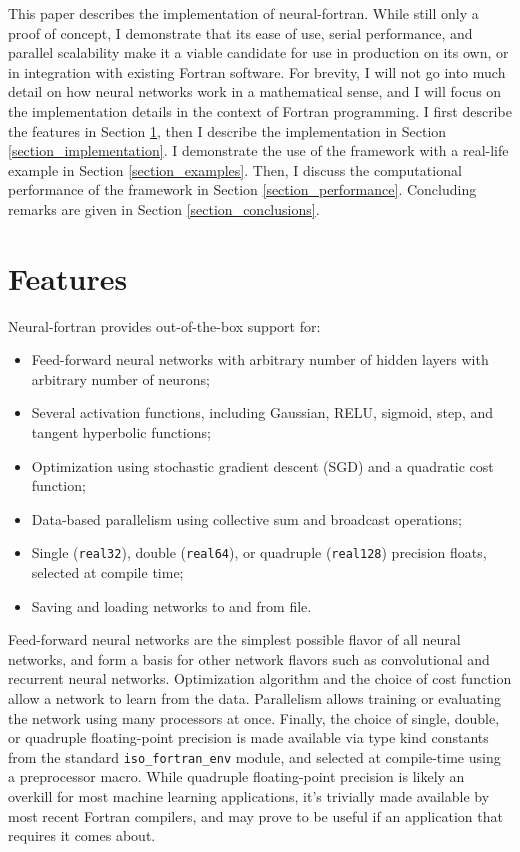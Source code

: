 \documentclass[sigplan, review=false, screen=true, balance=true]{acmart}
\begin{document}
This paper describes the implementation of neural-fortran. While still only a
proof of concept, I demonstrate that its ease of use, serial performance, and
parallel scalability make it a viable candidate for use in production on its
own, or in integration with existing Fortran software. For brevity, I will not
go into much detail on how neural networks work in a mathematical sense, and I
will focus on the implementation details in the context of Fortran programming.
I first describe the features in Section \ref{section_features}, then I describe
the implementation in Section \ref{section_implementation}. I demonstrate the
use of the framework with a real-life example in Section \ref{section_examples}.
Then, I discuss the computational performance of the framework in Section
\ref{section_performance}. Concluding remarks are given in Section
\ref{section_conclusions}.

\section{Features} \label{section_features}

Neural-fortran provides out-of-the-box support for:

\begin{itemize}
  \item Feed-forward neural networks with arbitrary number of hidden layers with
  arbitrary number of neurons;
  \item Several activation functions, including Gaussian, RELU, sigmoid, step,
  and tangent hyperbolic functions;
  \item Optimization using stochastic gradient descent (SGD) \citep{rumelhart86}
  and a quadratic cost function;
  \item Data-based parallelism using collective sum and broadcast operations;
  \item Single (\lstinline{real32}), double (\lstinline{real64}), or quadruple
  (\lstinline{real128}) precision floats, selected at compile time;
  \item Saving and loading networks to and from file.
\end{itemize}

Feed-forward neural networks are the simplest possible flavor of all neural
networks, and form a basis for other network flavors such as convolutional
\citep{krizhevsky12} and recurrent \citep{hochreiter97} neural networks.
Optimization algorithm and the choice of cost function allow a network
to learn from the data. Parallelism allows training or evaluating the
network using many processors at once.
Finally, the choice of single, double, or quadruple floating-point
precision is made available via type kind constants from the 
standard \lstinline{iso_fortran_env} module, and selected at 
compile-time using a preprocessor macro. 
While quadruple floating-point precision is likely an overkill
for most machine learning applications, it's trivially made 
available by most recent Fortran compilers, and may prove to 
be useful if an application that requires it comes about.
\end{document}
